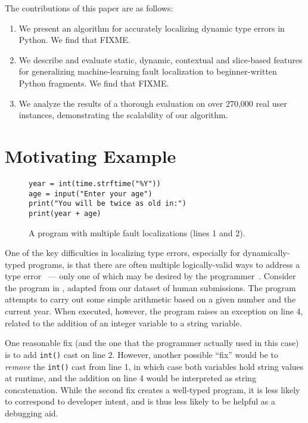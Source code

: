 \documentclass[conference]{IEEEtran}
\newcommand\lt[1]{{\lstinline|#1|}}
\begin{document}
The contributions of this paper are as follows:
\begin{enumerate}

\item We present an algorithm for accurately localizing dynamic type errors
in Python. We find that FIXME. 

\item We describe and evaluate static, dynamic, contextual and slice-based
features for generalizing machine-learning fault localization to
beginner-written Python fragments. We find that FIXME.

\item We analyze the results of a thorough evaluation on over 270,000 real
user instances, demonstrating the scalability of our algorithm. 

\end{enumerate} 

\section{Motivating Example}
\label{sec-motex} 

\begin{figure}
\begin{lstlisting}
year = int(time.strftime("%Y"))
age = input("Enter your age")
print("You will be twice as old in:")
print(year + age)
\end{lstlisting}
\caption{
\label{fig-motex}
A program with multiple fault localizations (lines 1 and 2).}
\end{figure}

One of the key difficulties in localizing type errors, especially for
dynamically-typed programs, is that there are often multiple
logically-valid ways to address a type error~\cite{FIXME} --- only one of
which may be desired by the programmer~\cite{FIXME}.  Consider the program
in , adapted from our dataset of human submissions. The
program attempts to carry out some simple arithmetic based on a given
number and the current year. When executed, however, the program raises an
exception on line 4, related to the addition of an integer variable to a
string variable.

One reasonable fix (and the one that the programmer actually used in this
case) is to add \lt{int()} cast on line 2. However, another possible
``fix'' would be to \textit{remove} the \lt{int()} cast from line 1, in
which case both variables hold string values at runtime, and the addition
on line 4 would be interpreted as string concatenation. While the second
fix creates a well-typed program, it is less likely to correspond to
developer intent, and is thus less likely to be helpful as a debugging aid.
\end{document}
